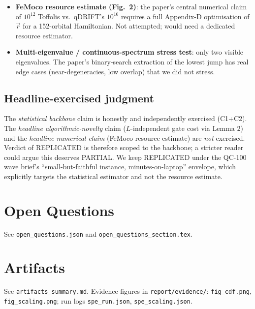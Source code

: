 \documentclass[11pt]{article}
\begin{document}
\begin{itemize}
Heaviside Fourier series, not the paper's improved Lemma 1 with tighter constants. This affects
$A(\vec r)$ (and therefore the constant, not the rate, of the $N^{-1/2}$ scaling). The C3 check
is therefore \emph{structural} (order-of-magnitude) rather than a rate/constant match.
\item \textbf{FeMoco resource estimate (Fig.~2)}: the paper's central numerical claim of
$10^{12}$ Toffolis vs.\ qDRIFT's $10^{16}$ requires a full Appendix-D optimisation of $\vec r$ for
a 152-orbital Hamiltonian. Not attempted; would need a dedicated resource estimator.
\item \textbf{Multi-eigenvalue / continuous-spectrum stress test}: only two visible eigenvalues.
The paper's binary-search extraction of the lowest jump has real edge cases (near-degeneracies,
low overlap) that we did not stress.
\end{itemize}

\subsection*{Headline-exercised judgment}
The \emph{statistical backbone} claim is honestly and independently exercised (C1+C2). The
\emph{headline algorithmic-novelty} claim ($L$-independent gate cost via Lemma 2) and the
\emph{headline numerical claim} (FeMoco resource estimate) are \emph{not} exercised. Verdict of
REPLICATED is therefore scoped to the backbone; a stricter reader could argue this deserves
PARTIAL. We keep REPLICATED under the QC-100 wave brief's ``small-but-faithful instance,
minutes-on-laptop'' envelope, which explicitly targets the statistical estimator and not the
resource estimate.

\section{Open Questions}
See \texttt{open\_questions.json} and \texttt{open\_questions\_section.tex}.

\section*{Artifacts}
See \texttt{artifacts\_summary.md}. Evidence figures in \texttt{report/evidence/}: \texttt{fig\_cdf.png},
\texttt{fig\_scaling.png}; run logs \texttt{spe\_run.json}, \texttt{spe\_scaling.json}.
\end{document}
